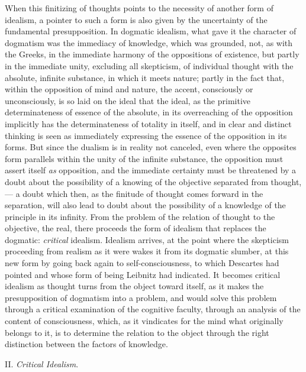 When this finitizing of thoughts points to the necessity of another form of idealism, a
pointer to such a form is also given by the uncertainty of the fundamental presupposition. In
dogmatic idealism, what gave it the character of dogmatism was the immediacy of knowledge, which
was grounded, not, as with the Greeks, in the immediate harmony of the oppositions of existence, but
partly in the immediate unity, excluding all skepticism, of individual thought with the absolute,
infinite substance, in which it meets nature; partly in the fact that, within the opposition of
mind and nature, the accent, consciously or unconsciously, is so laid on the ideal that the ideal,
as the primitive determinateness of essence of the absolute, in its overreaching of the opposition
implicitly has the determinateness of totality in itself, and in clear and distinct thinking is seen
as immediately expressing the essence of the opposition in its forms. But since the dualism is in
reality not canceled, even where the opposites form parallels within the unity of the infinite
substance, the opposition must assert itself \emph{as} opposition, and the immediate certainty must
be threatened by a doubt about the possibility of a knowing of the objective separated from
thought, --- a doubt which then, as the finitude of thought comes forward in the separation, will
also lead to doubt about the possibility of a knowledge of the principle in its infinity. From the
problem of the relation of thought to the objective, the real, there proceeds the form of idealism
that replaces the dogmatic: \emph{critical} idealism. Idealism arrives, at the point where the
skepticism proceeding from realism as it were wakes it from its dogmatic slumber, at this new form
by going back again to self-consciousness, to which Descartes had pointed and whose form of being
Leibnitz had indicated. It becomes critical idealism as thought turns from the object toward itself,
as it makes the presupposition of dogmatism into a problem, and would solve this problem through a
critical examination of the cognitive faculty, through an analysis of the content of consciousness,
which, as it vindicates for the mind what originally belongs to it, is to determine the
relation to the object through the right distinction between the factors of knowledge.

\divrule

\begin{center}
  II. \emph{Critical Idealism}.
\end{center}

